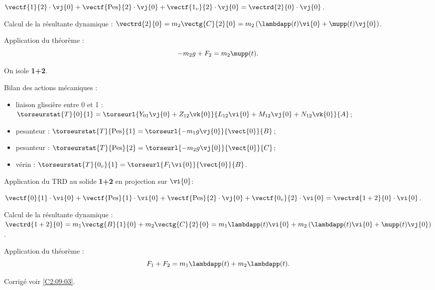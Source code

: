 $\vectf{1}{2}\cdot \vj{0} + \vectf{\text{Pes}}{2}\cdot \vj{0}+ \vectf{1_v}{2}\cdot \vj{0} = \vectrd{2}{0}\cdot \vj{0}$.

\vspace{.25cm}

Calcul de la résultante dynamique : 
$\vectrd{2}{0} = m_2 \vectg{C}{2}{0} = m_2 \left(\lambdapp (t) \vi{0}+\mupp (t) \vj{0}\right)$.

Application du théorème : 
$$
-m_2g  + F_2 = m_2\mupp (t).
$$
\else
\fi


\ifprof
On isole \textbf{1+2}. 

\vspace{.25cm}

Bilan des actions mécaniques : 
\begin{itemize}
\item liaison glissière entre 0 et 1 : 
$\torseurstat{T}{0}{1}= \torseurl{Y_{01}\vj{0}+Z_{12}\vk{0}}{L_{12}\vi{0}+M_{12}\vj{0}+N_{12}\vk{0}}{A}$;
\item pesanteur : $\torseurstat{T}{\text{Pes}}{1}= \torseurl{-m_1 g \vj{0}}{\vect{0}}{B}$;
\item pesanteur : $\torseurstat{T}{\text{Pes}}{2}= \torseurl{-m_2 g \vj{0}}{\vect{0}}{C}$;
\item vérin : $\torseurstat{T}{0_v}{1}= \torseurl{F_1 \vi{0}}{\vect{0}}{B}$.
\end{itemize}

\vspace{.25cm}

Application du TRD au solide \textbf{1+2} en projection sur $\vi{0}$: 

$\vectf{0}{1}\cdot \vi{0} + \vectf{\text{Pes}}{1}\cdot \vi{0}+ \vectf{\text{Pes}}{2}\cdot \vj{0}+ \vectf{0_v}{2}\cdot \vi{0} = \vectrd{1+2}{0}\cdot \vi{0}$.

\vspace{.25cm}

Calcul de la résultante dynamique : 
$\vectrd{1+2}{0} = m_1 \vectg{B}{1}{0}+m_2 \vectg{C}{2}{0} = m_1 \lambdapp (t) \vi{0} + m_2 \left(\lambdapp (t) \vi{0}+\mupp (t) \vj{0}\right)$.

Application du théorème : 
$$
F_1  + F_2 = m_1 \lambdapp (t)  + m_2 \lambdapp (t) .
$$

\else
\fi


\ifprof
\else
\begin{flushright}
\footnotesize{Corrigé  voir \ref{C2:09:03}.}
\end{flushright}%
\fi